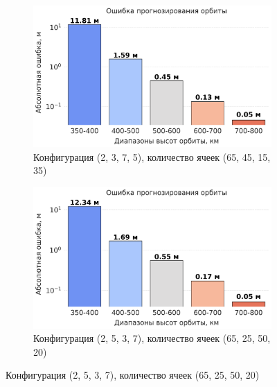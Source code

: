 \begin{figure}[htbp]
    \begin{subfigure}[b]{0.48\textwidth}
        \includegraphics[width=\linewidth]{../images/solution/atmo/propagation/2375.png}
        \caption{Конфигурация (2, 3, 7, 5),
        количество ячеек (65, 45, 15, 35)}
        \label{fig:atmo:2375_propag}
    \end{subfigure}
    \hfill
    \begin{subfigure}[b]{0.48\textwidth}
        \includegraphics[width=\linewidth]{../images/solution/atmo/propagation/2537.png}
        \caption{Конфигурация (2, 5, 3, 7),
        количество ячеек (65, 25, 50, 20)}
        \label{fig:atmo:2537_propag}
    \end{subfigure}
    
    \vspace{0.5cm} %
    

\end{figure}
